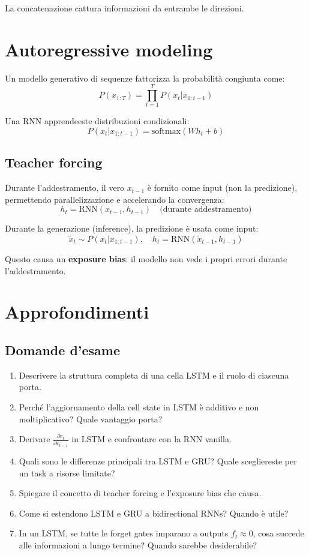 La concatenazione cattura informazioni da entrambe le direzioni.

\section{Autoregressive modeling}

Un modello generativo di sequenze fattorizza la probabilità congiunta come:
\[
P(x_{1:T}) = \prod_{t=1}^{T} P(x_t | x_{1:t-1})
\]

Una RNN apprendeeste distribuzioni condizionali:
\[
P(x_t | x_{1:t-1}) = \text{softmax}(W h_t + b)
\]

\subsection{Teacher forcing}

Durante l'addestramento, il vero $x_{t-1}$ è fornito come input (non la predizione), permettendo parallelizzazione e accelerando la convergenza:
\[
h_t = \text{RNN}(x_{t-1}, h_{t-1}) \quad \text{(durante addestramento)}
\]

Durante la generazione (inference), la predizione è usata come input:
\[
\tilde{x}_t \sim P(x_t | x_{1:t-1}), \quad h_t = \text{RNN}(\tilde{x}_{t-1}, h_{t-1})
\]

Questo causa un \textbf{exposure bias}: il modello non vede i propri errori durante l'addestramento.

\section{Approfondimenti}

\subsection{Domande d'esame}

\begin{enumerate}
\item Descrivere la struttura completa di una cella LSTM e il ruolo di ciascuna porta.
\item Perché l'aggiornamento della cell state in LSTM è additivo e non moltiplicativo? Quale vantaggio porta?
\item Derivare $\frac{\partial c_t}{\partial c_{t-1}}$ in LSTM e confrontare con la RNN vanilla.
\item Quali sono le differenze principali tra LSTM e GRU? Quale scegliereste per un task a risorse limitate?
\item Spiegare il concetto di teacher forcing e l'exposure bias che causa.
\item Come si estendono LSTM e GRU a bidirectional RNNs? Quando è utile?
\item In un LSTM, se tutte le forget gates imparano a outputs $f_t \approx 0$, cosa succede alle informazioni a lungo termine? Quando sarebbe desiderabile?
\end{enumerate}

